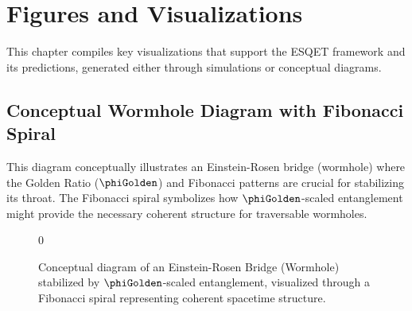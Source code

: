 \chapter{Figures and Visualizations}
\label{ch:figures}

This chapter compiles key visualizations that support the ESQET framework and its predictions, generated either through simulations or conceptual diagrams.

\section{Conceptual Wormhole Diagram with Fibonacci Spiral}
This diagram conceptually illustrates an Einstein-Rosen bridge (wormhole) where the Golden Ratio ($\phiGolden$) and Fibonacci patterns are crucial for stabilizing its throat. The Fibonacci spiral symbolizes how $\phiGolden$-scaled entanglement might provide the necessary coherent structure for traversable wormholes.

\begin{figure}[h!]
    \centering
    \caption{Conceptual diagram of an Einstein-Rosen Bridge (Wormhole) stabilized by $\phiGolden$-scaled entanglement, visualized through a Fibonacci spiral representing coherent spacetime structure.}
0
    \label{fig:wormhole_fibonacci}
\end{figure}

